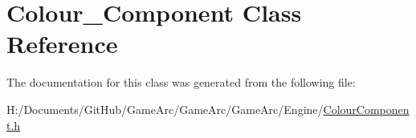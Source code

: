 \hypertarget{class_colour___component}{\section{Colour\+\_\+\+Component Class Reference}
\label{class_colour___component}
}


The documentation for this class was generated from the following file\+:\begin{DoxyCompactItemize}
\item 
H\+:/\+Documents/\+Git\+Hub/\+Game\+Arc/\+Game\+Arc/\+Game\+Arc/\+Engine/\hyperlink{_colour_component_8h}{Colour\+Component.\+h}\end{DoxyCompactItemize}

